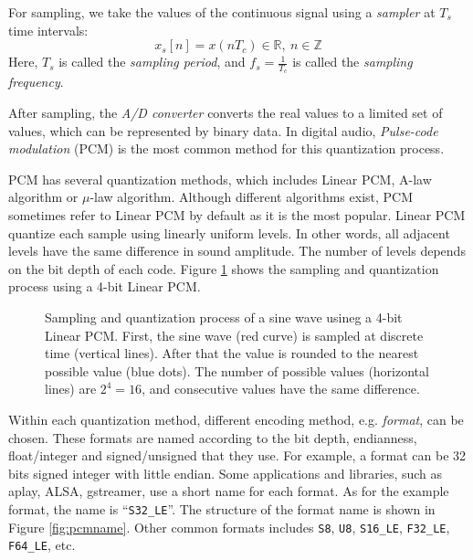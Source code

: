 \documentclass[11pt,a4paper]{report}
\begin{document}
For sampling, we take the values of the continuous signal using a \textit{sampler} at $T_s$ time intervals: \[ x_s[n] = x(n T_c) \in \mathbb{R},~ n \in \mathbb{Z} \] Here, $T_s$ is called the \textit{sampling period}, and $ f_s = \frac{1}{T_c} $ is called the \textit{sampling frequency}.

After sampling, the \textit{A/D converter} converts the real values to a limited set of values, which can be represented by binary data. In digital audio, \textit{Pulse-code modulation} (PCM) is the most common method for this quantization process. 

PCM has several quantization methods, which includes Linear PCM, A-law algorithm or $\mu$-law algorithm. Although different algorithms exist, PCM sometimes refer to Linear PCM by default as it is the most popular. Linear PCM quantize each sample using linearly uniform levels. In other words, all adjacent levels have the same difference in sound amplitude. The number of levels depends on the bit depth of each code. Figure \ref{fig:pcm} shows the sampling and quantization process using a 4-bit Linear PCM.

\begin{figure}[htbp]
  \centering
  
  \caption{Sampling and quantization process of a sine wave usineg a 4-bit Linear PCM. First, the sine wave (red curve) is sampled at discrete time (vertical lines). After that the value is rounded to the nearest possible value (blue dots). The number of possible values (horizontal lines) are $2^4=16$, and consecutive values have the same difference.}
  \label{fig:pcm}
\end{figure}

Within each quantization method, different encoding method, e.g. \textit{format}, can be chosen. These formats are named according to the bit depth, endianness, float/integer and signed/unsigned that they use. For example, a format can be 32 bits signed integer with little endian. Some applications and libraries, such as aplay, ALSA, gstreamer, use a short name for each format. As for the example format, the name is ``\texttt{S32\_LE}''. The structure of the format name is shown in Figure \ref{fig:pcmname}. Other common formats includes \texttt{S8}, \texttt{U8}, \texttt{S16\_LE}, \texttt{F32\_LE}, \texttt{F64\_LE}, etc.
\end{document}
